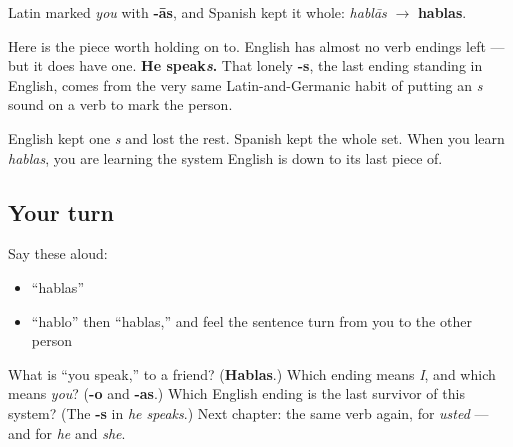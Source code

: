 \begin{cousinweb}
Latin marked \emph{you} with \textbf{-ās}, and Spanish kept it whole: \emph{hablās} $\to$ \textbf{hablas}.

Here is the piece worth holding on to. English has almost no verb endings left — but it does have one. \textbf{He speak\emph{s}.} That lonely \textbf{-s}, the last ending standing in English, comes from the very same Latin-and-Germanic habit of putting an \emph{s} sound on a verb to mark the person.

English kept one \emph{s} and lost the rest. Spanish kept the whole set. When you learn \emph{hablas}, you are learning the system English is down to its last piece of.
\end{cousinweb}

\subsection*{Your turn}
Say these aloud:

\begin{itemize}
\raggedright
  \item \textquotedblleft{}hablas\textquotedblright{}
  \item \textquotedblleft{}hablo\textquotedblright{} then \textquotedblleft{}hablas,\textquotedblright{} and feel the sentence turn from you to the other person
\end{itemize}

\begin{tcolorbox}[breakable,colback=teal!4,colframe=teal!35!black,title={Before you move on}]
What is \textquotedblleft{}you speak,\textquotedblright{} to a friend? (\textbf{Hablas}.) Which ending means \emph{I}, and which means \emph{you}? (\textbf{-o} and \textbf{-as}.) Which English ending is the last survivor of this system? (The \textbf{-s} in \emph{he speaks}.) Next chapter: the same verb again, for \emph{usted} — and for \emph{he} and \emph{she}.
\end{tcolorbox}
